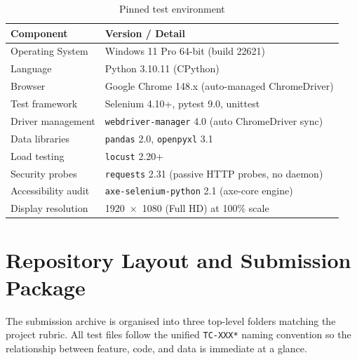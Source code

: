 \documentclass[twoside,final]{hcmut-report}
\begin{document}
\begin{table}[H]
\centering
\renewcommand{\arraystretch}{1.3}
\begin{tabularx}{\textwidth}{|l|X|}
\hline
\textbf{Component} & \textbf{Version / Detail} \\ \hline
Operating System & Windows 11 Pro 64-bit (build 22621) \\ \hline
Language & Python 3.10.11 (CPython) \\ \hline
Browser & Google Chrome 148.x (auto-managed ChromeDriver) \\ \hline
Test framework & Selenium 4.10+, pytest 9.0, unittest \\ \hline
Driver management & \texttt{webdriver-manager} 4.0 (auto ChromeDriver sync) \\ \hline
Data libraries & \texttt{pandas} 2.0, \texttt{openpyxl} 3.1 \\ \hline
Load testing & \texttt{locust} 2.20+ \\ \hline
Security probes & \texttt{requests} 2.31 (passive HTTP probes, no daemon) \\ \hline
Accessibility audit & \texttt{axe-selenium-python} 2.1 (axe-core engine) \\ \hline
Display resolution & 1920~$\times$~1080 (Full HD) at 100\% scale \\ \hline
\end{tabularx}
\caption{Pinned test environment}
\end{table}

\section{Repository Layout and Submission Package}

The submission archive is organised into three top-level folders matching the project rubric. All test files follow the unified \texttt{TC-XXX*} naming convention so the relationship between feature, code, and data is immediate at a glance.
\end{document}
